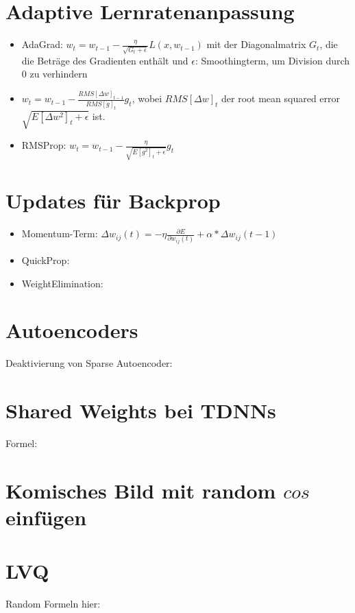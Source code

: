 \documentclass[paper=a4, fontsize=11pt]{scrartcl} %
\begin{document}
\section{Adaptive Lernratenanpassung}

\begin{itemize}
\item AdaGrad: $w_t = w_{t-1} - \frac{\eta}{\sqrt{G_t+\epsilon}} L(x,w_{t-1})$ mit der Diagonalmatrix $G_t$, die die Beträge des Gradienten enthält und $\epsilon$: Smoothingterm, um Division durch 0 zu verhindern
\item $w_t = w_{t-1} - \frac{RMS[\Delta w]_{t-1}}{RMS[g]_t}g_t$, wobei $RMS[\Delta w]_t$ der \glqq root mean squared error\grqq\ $\sqrt{E[\Delta w^2]_t + \epsilon}$ ist.
\item RMSProp: $w_t = w_{t-1} - \frac{\eta}{\sqrt{E[g^2]_t + \epsilon}} g_t$
\end{itemize}

\section{Updates für Backprop}

\begin{itemize}
\item Momentum-Term: $\Delta w_{ij}(t) = - \eta \frac{\partial E}{\partial w_{ij}(t)} + \alpha * \Delta w_{ij}(t-1)$
\item QuickProp: 
\item WeightElimination: 
\end{itemize}

\section{Autoencoders}

Deaktivierung von Sparse Autoencoder: 

\section{Shared Weights bei TDNNs}

Formel: 

\section{Komisches Bild mit random $cos$ einfügen}

\section{LVQ}

Random Formeln hier:
\end{document}
